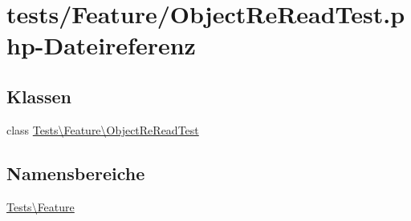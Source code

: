 \hypertarget{ObjectReReadTest_8php}{}\section{tests/\+Feature/\+Object\+Re\+Read\+Test.php-\/\+Dateireferenz}
\label{ObjectReReadTest_8php}
\subsection*{Klassen}
\begin{DoxyCompactItemize}
\item 
class \hyperlink{classTests_1_1Feature_1_1ObjectReReadTest}{Tests\textbackslash{}\+Feature\textbackslash{}\+Object\+Re\+Read\+Test}
\end{DoxyCompactItemize}
\subsection*{Namensbereiche}
\begin{DoxyCompactItemize}
\item 
 \hyperlink{namespaceTests_1_1Feature}{Tests\textbackslash{}\+Feature}
\end{DoxyCompactItemize}

